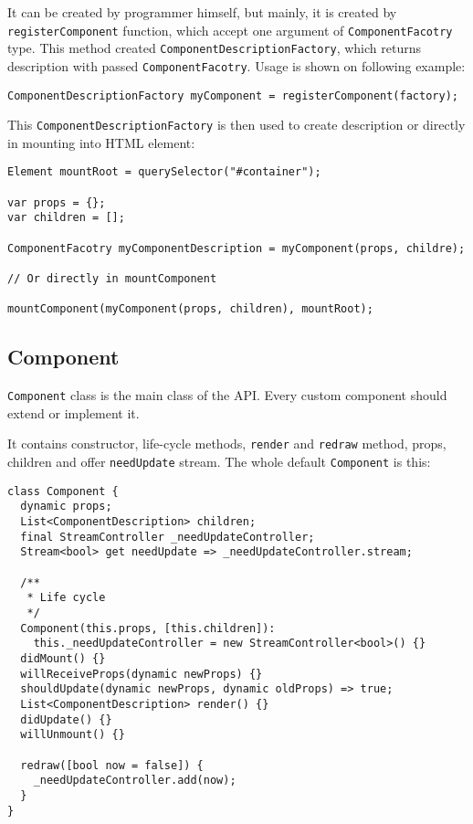 \documentclass[oneside, 12pt]{book}
\begin{document}
  It can be created by programmer himself, but mainly, it is created by \texttt{registerComponent} function, which accept one argument of \texttt{ComponentFacotry} type.
  This method created \texttt{ComponentDescriptionFactory}, which returns description with passed \texttt{ComponentFacotry}.
  Usage is shown on following example:
\begin{verbatim}
ComponentDescriptionFactory myComponent = registerComponent(factory);
\end{verbatim}



  This \texttt{ComponentDescriptionFactory} is then used to create description or directly in mounting into HTML element:
\begin{verbatim}
Element mountRoot = querySelector("#container");

var props = {};
var children = [];

ComponentFacotry myComponentDescription = myComponent(props, childre);

// Or directly in mountComponent

mountComponent(myComponent(props, children), mountRoot);
\end{verbatim}



  \subsection{Component}\label{subsec:our-api-component}

    \texttt{Component} class is the main class of the API.
    Every custom component should extend or implement it. 

    It contains constructor, life-cycle methods, \texttt{render} and \texttt{redraw} method, props, children and offer \texttt{needUpdate} stream.
    The whole default \texttt{Component} is this: 
\begin{verbatim}
class Component {
  dynamic props;
  List<ComponentDescription> children;
  final StreamController _needUpdateController;
  Stream<bool> get needUpdate => _needUpdateController.stream; 

  /**
   * Life cycle
   */
  Component(this.props, [this.children]): 
    this._needUpdateController = new StreamController<bool>() {}
  didMount() {}
  willReceiveProps(dynamic newProps) {}
  shouldUpdate(dynamic newProps, dynamic oldProps) => true;
  List<ComponentDescription> render() {}
  didUpdate() {}
  willUnmount() {}
  
  redraw([bool now = false]) {
    _needUpdateController.add(now);
  }
}
\end{verbatim}
\end{document}
